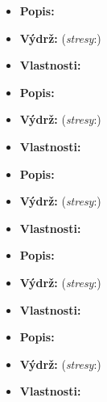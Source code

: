 \documentclass[../main.tex]{subfiles}
\begin{document}
\begin{Predmet}
\begin{itemize}
	\item \textbf{Popis:} 
	\item \textbf{Výdrž:} (\emph{stresy}:) 
	\item \textbf{Vlastnosti:} 
\end{itemize}
\end{Predmet}

\begin{Predmet}
\begin{itemize}
	\item \textbf{Popis:} 
	\item \textbf{Výdrž:} (\emph{stresy}:) 
	\item \textbf{Vlastnosti:} 
\end{itemize}
\end{Predmet}

\begin{Predmet}
\begin{itemize}
	\item \textbf{Popis:} 
	\item \textbf{Výdrž:} (\emph{stresy}:) 
	\item \textbf{Vlastnosti:} 
\end{itemize}
\end{Predmet}

\begin{Predmet}
\begin{itemize}
	\item \textbf{Popis:} 
	\item \textbf{Výdrž:} (\emph{stresy}:) 
	\item \textbf{Vlastnosti:} 
\end{itemize}
\end{Predmet}

\begin{Predmet}
\begin{itemize}
	\item \textbf{Popis:} 
	\item \textbf{Výdrž:} (\emph{stresy}:) 
	\item \textbf{Vlastnosti:} 
\end{itemize}
\end{Predmet}
\end{document}
